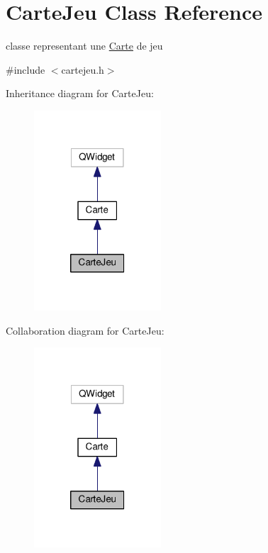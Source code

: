 \hypertarget{classCarteJeu}{\section{Carte\+Jeu Class Reference}
\label{classCarteJeu}
}


classe representant une \hyperlink{classCarte}{Carte} de jeu  




{\ttfamily \#include $<$cartejeu.\+h$>$}



Inheritance diagram for Carte\+Jeu\+:
\nopagebreak
\begin{figure}[H]
\begin{center}
\leavevmode
\includegraphics[width=134pt]{classCarteJeu__inherit__graph}
\end{center}
\end{figure}


Collaboration diagram for Carte\+Jeu\+:
\nopagebreak
\begin{figure}[H]
\begin{center}
\leavevmode
\includegraphics[width=134pt]{classCarteJeu__coll__graph}
\end{center}
\end{figure}
